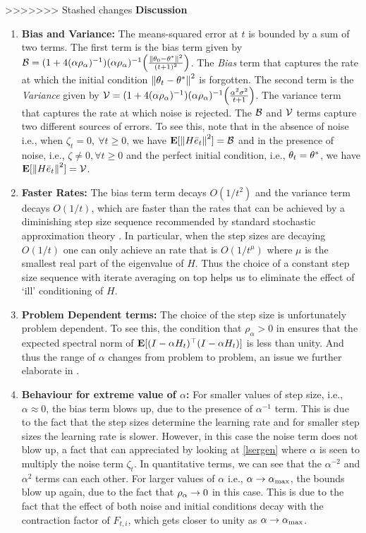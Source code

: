 >>>>>>> Stashed changes
\textbf{Discussion}
\begin{enumerate}[leftmargin=*]
\item \textbf{Bias and Variance:} The means-squared error at $t$ is bounded by a sum of two terms. The first term is the bias term given by $\mathcal{B}=(1+4(\alpha\rho_{\alpha})^{-1}) (\alpha\rho_{\alpha})^{-1} \Big(\frac{\left\| \theta_0-\theta^*\right\|^2}{(t+1)^2}\Big)$.  The \emph{Bias} term that captures the rate at which the initial condition $\left\| \theta_t-\theta^*\right\|^2$ is forgotten. The second term is the \emph{Variance} given by $\mathcal{V}=(1+4(\alpha\rho_{\alpha})^{-1}) (\alpha\rho_{\alpha})^{-1} \Big(\frac{\alpha^2\sigma^2}{t+1} \Big)$. The variance term that captures the rate at which noise is rejected. The $\mathcal{B}$ and $\mathcal{V}$ terms capture two different sources of errors. To see this, note that in the absence of noise i.e., when $\zeta_t=0,~\forall t\geq 0$, we have $\mathbf{E}[\left\| H\bar{e}_t\right\|^2]=\mathcal{B}$ and in the presence of noise, i.e., $\zeta\neq 0,\forall t\geq 0$ and the perfect initial condition, i.e., $\theta_t=\theta^*$, we have $\mathbf{E}[\left\| H\bar{e}_t\right\|^2]=\mathcal{V}$.
\item \textbf{Faster Rates:} The bias term term decays $O(1/t^2)$ and the variance term decays $O(1/t)$, which are faster than the rates that can be achieved by a diminishing step size sequence recommended by standard stochastic approximation theory \cite{sa}. In particular, when the step sizes are decaying $O(1/t)$ one can only achieve an rate that is $O(1/t^\mu)$ where $\mu$ is the smallest real part of the eigenvalue of $H$. Thus the choice of a constant step size sequence with iterate averaging on top helps us to eliminate the effect of `ill' conditioning of $H$.
\item \textbf{Problem Dependent terms:} The choice of the step size is unfortunately problem dependent. To see this, the condition that $\rho_{\alpha}>0$ in  ensures that the expected spectral norm of $\mathbf{E}[(I-\alpha H_t)^\top(I-\alpha H_t)]$ is less than unity. And thus the range of $\alpha$ changes from problem to problem, an issue we further elaborate in .
\item \textbf{Behaviour for extreme value of $\alpha$:} For smaller values of step size, i.e., $\alpha\approx 0$, the bias term blows up, due to the presence of $\alpha^{-1}$ term. This is due to the fact that the step sizes determine the learning rate and for smaller step sizes the learning rate is slower. However, in this case the noise term does not blow up, a fact that can appreciated by looking at \eqref{lsergen} where $\alpha$ is seen to multiply the noise term $\zeta_t$. In quantitative terms, we can see that the $\alpha^{-2}$ and $\alpha^2$ terms can each other. For larger values of $\alpha$ i.e., $\alpha\rightarrow \alpha_{\max}$, the bounds blow up again, due to the fact that $\rho_{\alpha}\rightarrow 0$ in this case. This is due to the fact that the effect of both noise and initial conditions decay with the contraction factor of $F_{t,i}$, which gets closer to unity as $\alpha\rightarrow\alpha_{\max}$.
\end{enumerate}
